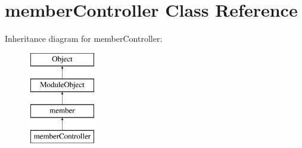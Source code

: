 \hypertarget{classmemberController}{\section{member\-Controller Class Reference}
\label{classmemberController}
}
Inheritance diagram for member\-Controller\-:\begin{figure}[H]
\begin{center}
\leavevmode
\includegraphics[height=4.000000cm]{classmemberController}
\end{center}
\end{figure}
